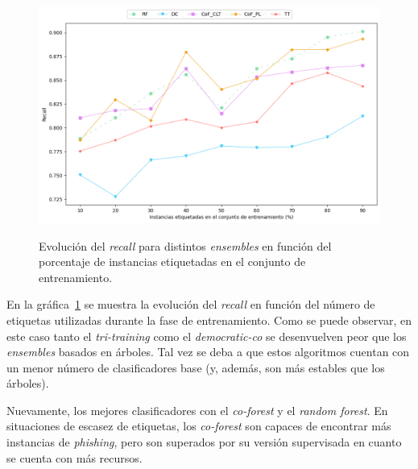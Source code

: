 \begin{figure}[h]
	\caption[\textit{Phishing}: comparativa SL contra SSL (\textit{recall})]{Evolución del \textit{recall} para distintos \textit{ensembles} en función del porcentaje de instancias etiquetadas en el conjunto de entrenamiento.}
	\centering
	\includegraphics[scale=0.45]{../img/memoria/5_phishing/f1f19_evolution_rec}
	\label{gr:ph-f1f19_sl-ssl-rec}
\end{figure}

En la gráfica~\ref{gr:ph-f1f19_sl-ssl-rec} se muestra la evolución del \textit{recall} en función del número de etiquetas utilizadas durante la fase de entrenamiento. Como se puede observar, en este caso tanto el \textit{tri-training} como el \textit{democratic-co} se desenvuelven peor que los \textit{ensembles} basados en árboles. Tal vez se deba a que estos algoritmos cuentan con un menor número de clasificadores base (y, además, son más estables que los árboles).

Nuevamente, los mejores clasificadores con el \textit{co-forest} y el \textit{random forest}. En situaciones de escasez de etiquetas, los \textit{co-forest} son capaces de encontrar más instancias de \textit{phishing}, pero son superados por su versión supervisada en cuanto se cuenta con más recursos.

